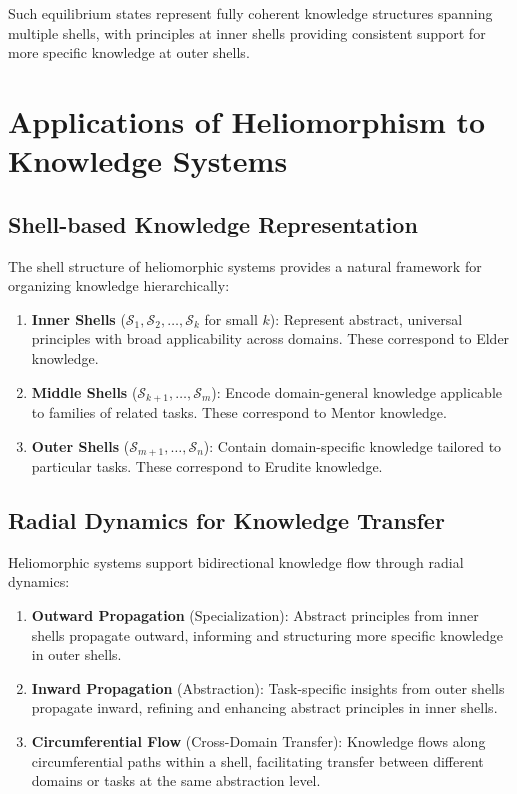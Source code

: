Such equilibrium states represent fully coherent knowledge structures spanning multiple shells, with principles at inner shells providing consistent support for more specific knowledge at outer shells.

\section{Applications of Heliomorphism to Knowledge Systems}

\subsection{Shell-based Knowledge Representation}

The shell structure of heliomorphic systems provides a natural framework for organizing knowledge hierarchically:

\begin{enumerate}
    \item \textbf{Inner Shells} ($\mathcal{S}_1, \mathcal{S}_2, \dots, \mathcal{S}_k$ for small $k$): Represent abstract, universal principles with broad applicability across domains. These correspond to Elder knowledge.
    
    \item \textbf{Middle Shells} ($\mathcal{S}_{k+1}, \dots, \mathcal{S}_{m}$): Encode domain-general knowledge applicable to families of related tasks. These correspond to Mentor knowledge.
    
    \item \textbf{Outer Shells} ($\mathcal{S}_{m+1}, \dots, \mathcal{S}_n$): Contain domain-specific knowledge tailored to particular tasks. These correspond to Erudite knowledge.
\end{enumerate}

\subsection{Radial Dynamics for Knowledge Transfer}

Heliomorphic systems support bidirectional knowledge flow through radial dynamics:

\begin{enumerate}
    \item \textbf{Outward Propagation} (Specialization): Abstract principles from inner shells propagate outward, informing and structuring more specific knowledge in outer shells.
    
    \item \textbf{Inward Propagation} (Abstraction): Task-specific insights from outer shells propagate inward, refining and enhancing abstract principles in inner shells.
    
    \item \textbf{Circumferential Flow} (Cross-Domain Transfer): Knowledge flows along circumferential paths within a shell, facilitating transfer between different domains or tasks at the same abstraction level.
\end{enumerate}

